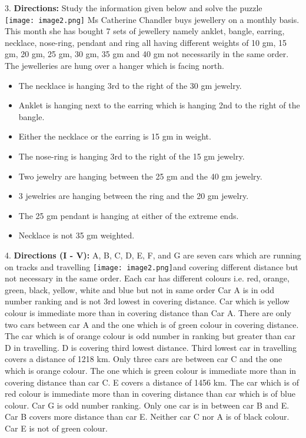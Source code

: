 \documentclass[
]{article}
\begin{document}
3. \textbf{Directions:} Study the information given below and solve the puzzle\\
\texttt{[image: image2.png]}
Ms Catherine Chandler buys jewellery on a monthly basis. This month she has bought 7 sets
of jewellery namely anklet, bangle, earring, necklace, nose-ring, pendant and ring all having
different weights of 10 gm, 15 gm, 20 gm, 25 gm, 30 gm, 35 gm and 40 gm not necessarily in
the same order. The jewelleries are hung over a hanger which is facing north.\\
\begin{itemize}
    \item The necklace is hanging 3rd to the right of the 30 gm jewelry.
\item Anklet is hanging next to the earring which is hanging 2nd to the right of the bangle.
\item Either the necklace or the earring is 15 gm in weight.
\item The nose-ring is hanging 3rd to the right of the 15 gm jewelry.
\item Two jewelry are hanging between the 25 gm and the 40 gm jewelry.
\item 3 jewelries are hanging between the ring and the 20 gm jewelry.
\item The 25 gm pendant is hanging at either of the extreme ends.
\item Necklace is not 35 gm weighted.
\end{itemize}

4. \textbf{Directions (I - V):} A, B, C, D, E, F, and G are seven cars which are running on tracks and
travelling \texttt{[image: image2.png]}and covering different distance but not necessary in the same order. Each car has
different colours i.e. red, orange, green, black, yellow, white and blue but not in same order
Car A is in odd number ranking and is not 3rd lowest in covering distance. Car which is
yellow colour is immediate more than in covering distance than Car A. There are only two
cars between car A and the one which is of green colour in covering distance. The car which
is of orange colour is odd number in ranking but greater than car D in travelling. D is covering
third lowest distance. Third lowest car in travelling covers a distance of 1218 km. Only three
cars are between car C and the one which is orange colour. The one which is green colour is
immediate more than in covering distance than car C. E covers a distance of 1456 km. The car
which is of red colour is immediate more than in covering distance than car which is of blue
colour. Car G is odd number ranking. Only one car is in between car B and E. Car B covers
more distance than car E. Neither car C nor A is of black colour. Car E is not of green colour.\\
\end{document}
